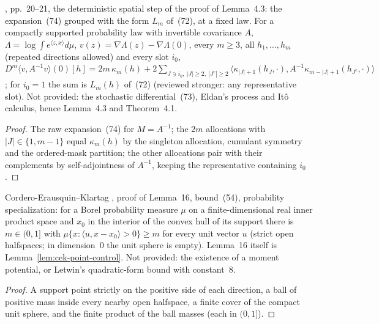 \begin{lemma}
  \label{lem:bkl-grouped-drift-expansion}
  \leanok
  \cite{BizeulKlartagLehec2026}, pp.~20--21, the deterministic spatial step of the proof of Lemma~4.3: the expansion~(74)
  grouped with the form $L_m$ of~(72), at a fixed law.  For a compactly supported probability law with invertible
  covariance $A$, $\Lambda=\log\int e^{\langle z,x\rangle}d\mu$, $v(z)=\nabla\Lambda(z)-\nabla\Lambda(0)$, every $m\ge3$,
  all $h_1,\dots,h_m$ (repeated directions allowed) and every slot $i_0$,
  $D^m\langle v,A^{-1}v\rangle(0)[h]=2m\,\kappa_m(h)+2\sum_{J\ni i_0,\ |J|\ge2,\ |J^c|\ge2}
  \langle\kappa_{|J|+1}(h_J,\cdot),A^{-1}\kappa_{m-|J|+1}(h_{J^c},\cdot)\rangle$; for $i_0=1$ the sum is $L_m(h)$
  of~(72) (reviewed stronger: any representative slot).  Not provided: the stochastic differential~(73), Eldan's process
  and It\^o calculus, hence Lemma~4.3 and Theorem~4.1.
\end{lemma}
\begin{proof}
  \leanok
  The raw expansion~(74) for $M=A^{-1}$; the $2m$ allocations with $|J|\in\{1,m-1\}$ equal $\kappa_m(h)$ by the singleton
  allocation, cumulant symmetry and the ordered-mask partition; the other allocations pair with their complements by
  self-adjointness of $A^{-1}$, keeping the representative containing $i_0$.
\end{proof}

\begin{lemma}
  \label{lem:uniform-halfspace-mass}
  \leanok
  Cordero-Erausquin--Klartag \cite{CorderoKlartag2015}, proof of Lemma~16, bound~(54), probability specialization: for a
  Borel probability measure $\mu$ on a finite-dimensional real inner product space and $x_0$ in the interior of the convex
  hull of its support there is $m\in(0,1]$ with $\mu\{x:\langle u,x-x_0\rangle>0\}\ge m$ for every unit vector $u$ (strict
  open halfspaces; in dimension~$0$ the unit sphere is empty).  Lemma~16 itself is
  Lemma~\ref{lem:cek-point-control}.  Not provided: the existence of a moment potential, or Letwin's quadratic-form
  bound with constant~$8$.
\end{lemma}
\begin{proof}
  \leanok
  A support point strictly on the positive side of each direction, a ball of positive mass inside every nearby open
  halfspace, a finite cover of the compact unit sphere, and the finite product of the ball masses (each in $(0,1]$).
\end{proof}

